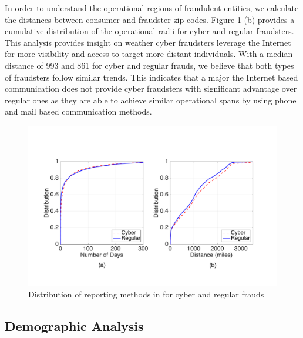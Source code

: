 \documentclass[conference]{IEEEtran}
\begin{document}
In order to understand the operational regions of fraudulent entities, we calculate the distances between consumer and fraudster zip codes. Figure \ref{reportingfig} (b) provides a cumulative distribution of the operational radii for cyber and regular fraudsters.  This analysis provides insight on weather cyber fraudsters leverage the Internet for more visibility and access to target more distant individuals. With a median distance of 993 and 861 for cyber and regular frauds, we believe that both types of fraudsters follow similar trends. This indicates that a major the Internet based communication does not provide cyber fraudsters with significant advantage over regular ones as they are able to achieve similar operational spans by using phone and mail based communication methods.

\begin{figure}[t]
\centering
  \includegraphics[scale=0.28]{graphics/dist_days.pdf}
  \caption{Distribution of reporting methods in for cyber and regular frauds}
  \label{reportingfig}
\end{figure}


\subsection{Demographic Analysis}\label{fraudsters}
\end{document}

